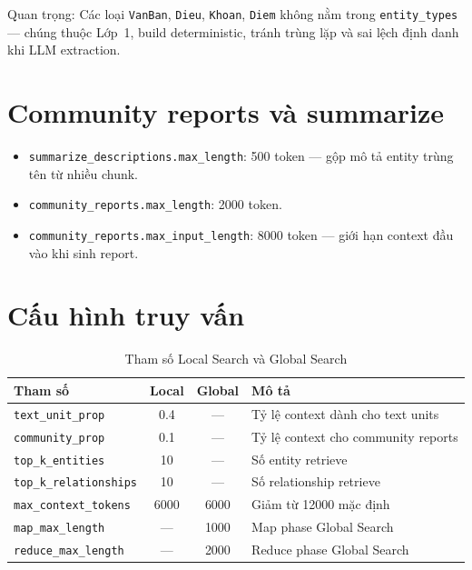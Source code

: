 \documentclass[../DoAn.tex]{subfiles}
\begin{document}
Quan trọng: Các loại \texttt{VanBan}, \texttt{Dieu}, \texttt{Khoan}, \texttt{Diem} không nằm trong \texttt{entity\_types} --- chúng thuộc Lớp~1, build deterministic, tránh trùng lặp và sai lệch định danh khi LLM extraction.

\section{Community reports và summarize}
\label{appendix:a-community}

\begin{itemize}[nosep, leftmargin=*]
    \item \texttt{summarize\_descriptions.max\_length}: 500 token --- gộp mô tả entity trùng tên từ nhiều chunk.
    \item \texttt{community\_reports.max\_length}: 2000 token.
    \item \texttt{community\_reports.max\_input\_length}: 8000 token --- giới hạn context đầu vào khi sinh report.
\end{itemize}

\section{Cấu hình truy vấn}
\label{appendix:a-query}

\begin{table}[htbp]
\centering
\caption{Tham số Local Search và Global Search}
\label{table:search-config}
\small
\begin{tabular}{|l|c|c|p{6cm}|}
\hline
\textbf{Tham số} & \textbf{Local} & \textbf{Global} & \textbf{Mô tả} \\
\hline
\texttt{text\_unit\_prop} & 0.4 & --- & Tỷ lệ context dành cho text units \\
\texttt{community\_prop} & 0.1 & --- & Tỷ lệ context cho community reports \\
\texttt{top\_k\_entities} & 10 & --- & Số entity retrieve \\
\texttt{top\_k\_relationships} & 10 & --- & Số relationship retrieve \\
\texttt{max\_context\_tokens} & 6000 & 6000 & Giảm từ 12000 mặc định \\
\texttt{map\_max\_length} & --- & 1000 & Map phase Global Search \\
\texttt{reduce\_max\_length} & --- & 2000 & Reduce phase Global Search \\
\hline
\end{tabular}
\end{table}
\end{document}
